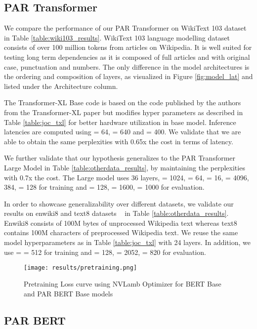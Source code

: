 \documentclass[11pt]{article}
\begin{document}
\subsection{PAR Transformer}

We compare the performance of our PAR Transformer on WikiText 103 dataset in Table \ref{table:wiki103_results}. WikiText 103 language modelling dataset consists of over 100 million tokens from articles on Wikipedia. It is well suited for testing long term dependencies as it is composed of full articles and with original case, punctuation and numbers. The only difference in the model architectures is the ordering and composition of layers, as visualized in Figure \ref{fig:model_lat} and listed under the Architecture column. 

The Transformer-XL Base code is based on the code published by the authors from the Transformer-XL paper but modifies hyper parameters as described in Table \ref{table:joc_txl} for better hardware utilization in base model. Inference latencies are computed using  = 64,  = 640 and  = 400. We validate that we are able to obtain the same perplexities with 0.65x the cost in terms of latency. 

We further validate that our hypothesis generalizes to the PAR Transformer Large Model in Table \ref{table:otherdata_results}, by maintaining the perplexities with 0.7x the cost. The Large model uses 36 layers,  = 1024,  = 64,  = 16,  = 4096, 384,  = 128 for training and  = 128,  = 1600,  = 1000 for evaluation.

In order to showcase generalizability over different datasets, we validate our results on enwiki8 and text8 datasets ~\citep{textenwiki} in Table \ref{table:otherdata_results}. Enwiki8 consists of 100M bytes of unprocessed Wikipedia text whereas text8 contains 100M characters of preprocessed Wikipedia text. We reuse the same model hyperparameters as in Table \ref{table:joc_txl} with 24 layers. In addition, we use  =  = 512 for training and  = 128,  = 2052,  = 820 for evaluation.


\begin{figure}
\centering
\texttt{[image: results/pretraining.png]}
\caption{Pretraining Loss curve using NVLamb Optimizer for BERT Base and PAR BERT Base models}
\label{fig:bert_pretraining}
\end{figure}

\subsection{PAR BERT}
\end{document}
